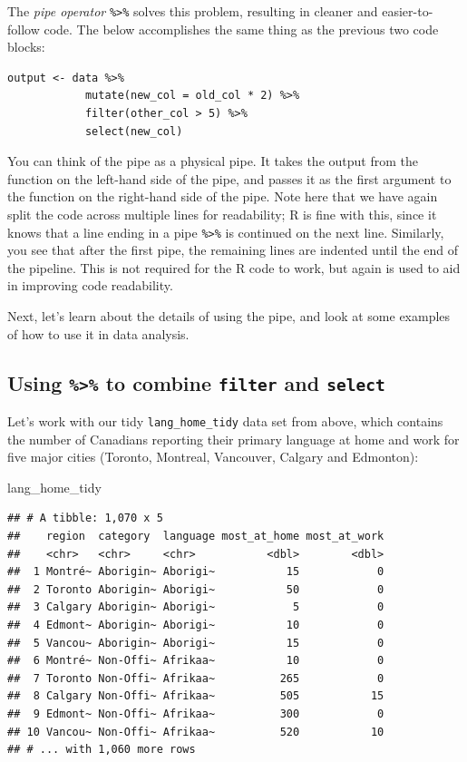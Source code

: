 \documentclass[
]{krantz}
\makeatletter
\newenvironment{Shaded}{\begin{snugshade}}{\end{snugshade}}
\newcommand{\NormalTok}[1]{#1}
\newenvironment{kframe}{%
\medskip{}
\setlength{\fboxsep}{.8em}
 \def\at@end@of@kframe{}%
 \ifinner\ifhmode%
  \def\at@end@of@kframe{\end{minipage}}%
  \begin{minipage}{\columnwidth}%
 \fi\fi%
 \def\FrameCommand##1{\hskip\@totalleftmargin \hskip-\fboxsep
 \colorbox{shadecolor}{##1}\hskip-\fboxsep
     \hskip-\linewidth \hskip-\@totalleftmargin \hskip\columnwidth}%
 \MakeFramed {\advance\hsize-\width
   \@totalleftmargin\z@ \linewidth\hsize
   \@setminipage}}%
 {\par\unskip\endMakeFramed%
 \at@end@of@kframe}
\renewenvironment{Shaded}{\begin{kframe}}{\end{kframe}}
\makeatother
\begin{document}
The \emph{pipe operator} \texttt{\%\textgreater{}\%} solves this problem, resulting in cleaner and easier-to-follow code. The below accomplishes the same thing as the previous two code blocks:

\begin{verbatim}
output <- data %>% 
            mutate(new_col = old_col * 2) %>%
            filter(other_col > 5) %>%
            select(new_col)
\end{verbatim}

You can think of the pipe as a physical pipe. It takes the output from the function on the left-hand side of the pipe, and
passes it as the first argument to the function on the right-hand side of the pipe. Note here that we have again split the
code across multiple lines for readability; R is fine with this, since it knows that a line ending in a pipe \texttt{\%\textgreater{}\%} is continued
on the next line. Similarly, you see that after the first pipe, the remaining
lines are indented until the end of the pipeline. This is not required for the
R code to work, but again is used to aid in improving code readability.

Next, let's learn about the details of using the pipe, and look at some examples of how to use it in data analysis.

\hypertarget{using-to-combine-filter-and-select}{%
\subsection{\texorpdfstring{Using \texttt{\%\textgreater{}\%} to combine \texttt{filter} and \texttt{select}}{Using \%\textgreater\% to combine filter and select}}\label{using-to-combine-filter-and-select}}

Let's work with our tidy \texttt{lang\_home\_tidy} data set from above, which contains the number of Canadians reporting their primary language at home and work for five major cities (Toronto, Montreal, Vancouver, Calgary and Edmonton):

\begin{Shaded}
\begin{Highlighting}[]
\NormalTok{lang\_home\_tidy}
\end{Highlighting}
\end{Shaded}

\begin{verbatim}
## # A tibble: 1,070 x 5
##    region  category  language most_at_home most_at_work
##    <chr>   <chr>     <chr>           <dbl>        <dbl>
##  1 Montré~ Aborigin~ Aborigi~           15            0
##  2 Toronto Aborigin~ Aborigi~           50            0
##  3 Calgary Aborigin~ Aborigi~            5            0
##  4 Edmont~ Aborigin~ Aborigi~           10            0
##  5 Vancou~ Aborigin~ Aborigi~           15            0
##  6 Montré~ Non-Offi~ Afrikaa~           10            0
##  7 Toronto Non-Offi~ Afrikaa~          265            0
##  8 Calgary Non-Offi~ Afrikaa~          505           15
##  9 Edmont~ Non-Offi~ Afrikaa~          300            0
## 10 Vancou~ Non-Offi~ Afrikaa~          520           10
## # ... with 1,060 more rows
\end{verbatim}
\end{document}
